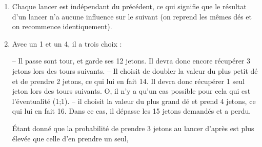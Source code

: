 \begin{enumerate}
\begin{enumerate}
             (2;3) ou (3;2) \par \smallskip
             $\mathcal{P}_a =\dfrac{\text{nombre de cas favorables}}{\text{nombre de cas possibles}} =\dfrac{2}{36} =\con{\dfrac{1}{18}}$.
          \item Il y a onze issues possibles à l'événement << au moins un des nombres obtenus est 3 >> : \par
             (3;1) ; (3;2) ; (3;3) ; (3;4) ; (3;5) ; (3;6) ; (1;3) ; (2;3) ; (4;3) ; (5;3) et (6;3). \par \smallskip 
             $\mathcal{P}_b =\dfrac{\text{nombre de cas favorables}}{\text{nombre de cas possibles}} =\con{\dfrac{11}{36}}$.
          \item Il y a treize issues possibles à l'événement << es nombres obtenus permettent de prendre 4 jetons >> : \par
             (1;4) ; (2;3) ; (2;4) ; (2;5) ; (2;6) ; (3;2) ; (3;4) ; (4;1) ; (4;2) ; (4;3) ; (4;4) ; (5;2) et (6;2). \par \smallskip 
             $\mathcal{P}_c =\dfrac{\text{nombre de cas favorables}}{\text{nombre de cas possibles}} =\con{\dfrac{13}{36}}$.
       \end{enumerate}
    \item Chaque lancer est indépendant du précédent, ce qui signifie que le résultat d'un lancer n'a aucune influence sur le suivant (on reprend les mêmes dés et on recommence identiquement). \par
    \item Avec un 1 et un 4, il a trois choix : \par
       -- Il passe sont tour, et garde ses 12 jetons. Il devra donc encore récupérer 3 jetons lors des tours suivants. \newline
       -- Il choisit de doubler la valeur du plus petit dé et de prendre 2 jetons, ce qui lui en fait 14. Il devra donc récupérer 1 seul jeton lors des tours suivants. O, il n'y a qu'un cas possible pour cela qui est l'éventualité (1;1). \newline 
       -- il choisit la valeur du plus grand dé et prend 4 jetons, ce qui lui en fait 16. Dans ce cas, il dépasse les 15 jetons demandés et a perdu. \par
       Étant donné que la probabilité de prendre 3 jetons au lancer d'après est plus élevée que celle d'en prendre un seul, \newline
 \end{enumerate}